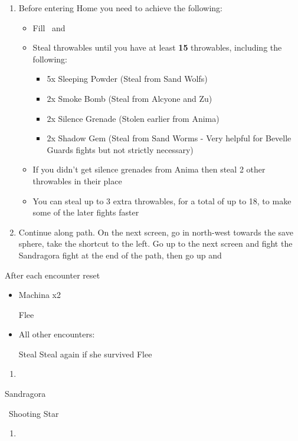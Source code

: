 \begin{enumerate}[resume]
	\item Before entering Home you need to achieve the following:
		\begin{itemize}
			\item Fill \rikku\ and \auron\ \od
			\item Steal throwables until you have at least \textbf{15} throwables, including the following:
			\begin{itemize}
				\item 5x Sleeping Powder (Steal from Sand Wolfs)
				\item 2x Smoke Bomb (Steal from Alcyone and Zu)
				\item 2x Silence Grenade (Stolen earlier from Anima)
				\item 2x Shadow Gem (Steal from Sand Worms - Very helpful for Bevelle Guards fights but not strictly necessary)
			\end{itemize}
			\item If you didn't get silence grenades from Anima then steal 2 other throwables in their place
			\item You can steal up to 3 extra throwables, for a total of up to 18, to make some of the later fights faster
		\end{itemize}
	\item Continue along path. On the next screen, go in north-west towards the save sphere, take the shortcut to the left. Go up to the next screen and fight the Sandragora fight at the end of the path, then go up and \sd
\end{enumerate}
\begin{encounters}
	After each encounter reset \formation{\tidus}{\wakka}{\auron}
	\begin{itemize}
		\item Machina x2
			\begin{itemize}
				\tidusf Flee
			\end{itemize}
		\item All other encounters:
			\begin{itemize}
				\switch{\tidus}{\rikku}
				\rikkuf Steal
				\rikkuf Steal again if she survived
				\switch{\wakka}{\tidus}
				\tidusf Flee
			\end{itemize}
	\end{itemize}
\end{encounters}
\begin{enumerate}[resume]
	\item \formation{\tidus}{\wakka}{\rikku}
\end{enumerate}
\begin{battle}{Sandragora}
	\begin{itemize}
		\switch{\tidus}{\auron}
		\auronf \od\ Shooting Star
	\end{itemize}
\end{battle}

\begin{enumerate}[resume]
	\item \formation{\tidus}{\wakka}{\auron}
\end{enumerate}